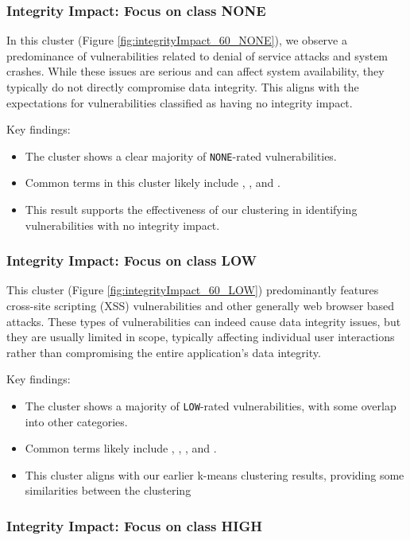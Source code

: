 \subsubsection{Integrity Impact: Focus on class NONE}

In this cluster (Figure \ref{fig:integrityImpact_60_NONE}), we observe a predominance of vulnerabilities related to denial of service attacks and system crashes. While these issues are serious and can affect system availability, they typically do not directly compromise data integrity. This aligns with the expectations for vulnerabilities classified as having no integrity impact.

Key findings:
\begin{itemize}
	\item The cluster shows a clear majority of \texttt{NONE}-rated vulnerabilities.
	\item Common terms in this cluster likely include , , and .
	\item This result supports the effectiveness of our clustering in identifying vulnerabilities with no integrity impact.
\end{itemize}

\subsubsection{Integrity Impact: Focus on class LOW}

This cluster (Figure \ref{fig:integrityImpact_60_LOW}) predominantly features cross-site scripting (XSS) vulnerabilities and other generally web browser based attacks. These types of vulnerabilities can indeed cause data integrity issues, but they are usually limited in scope, typically affecting individual user interactions rather than compromising the entire application's data integrity.

Key findings:
\begin{itemize}
	\item The cluster shows a majority of \texttt{LOW}-rated vulnerabilities, with some overlap into other categories.
	\item Common terms likely include , , , and .
	\item This cluster aligns with our earlier k-means clustering results, providing some similarities between the clustering
\end{itemize}

\subsubsection{Integrity Impact: Focus on class HIGH}

